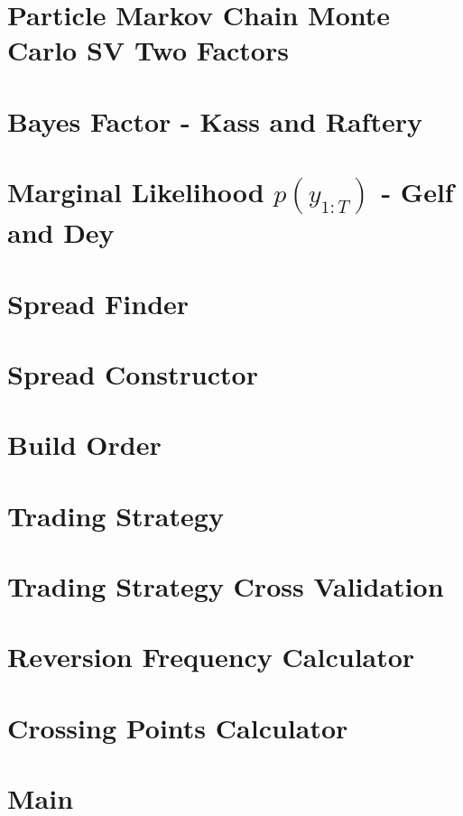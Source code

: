 \documentclass[11pt,a4,twosided,singlespacing,titlepagenumber=on]{scrreprt}
\numberwithin{equation}{chapter} %
\theoremstyle{remark}
\begin{document}
\section{Particle Markov Chain Monte Carlo SV Two Factors}


\section{Bayes Factor - Kass and Raftery}


\section{Marginal Likelihood $p(y_{1:T})$ - Gelf and Dey}


\section{Spread Finder}


\section{Spread Constructor}


\section{Build Order}


\section{Trading Strategy}


\section{Trading Strategy Cross Validation}


\section{Reversion Frequency Calculator}


\section{Crossing Points Calculator}


\section{Main}

\end{document}
